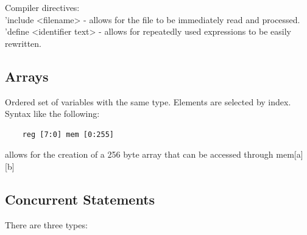 \documentclass[nobib]{tufte-handout}
\begin{document}
Compiler directives:\\
'include <filename> - allows for the file to be immediately read and processed.\\
'define <identifier text> - allows for repeatedly used expressions to be easily rewritten.
\subsection{Arrays}
Ordered set of variables with the same type. Elements are selected by index. Syntax like the following:
\begin{lstlisting}
    reg [7:0] mem [0:255]
\end{lstlisting}
allows for the creation of a 256 byte array that can be accessed through mem[a][b]\\
\subsection{Concurrent Statements}
There are three types:\\
\end{document}
